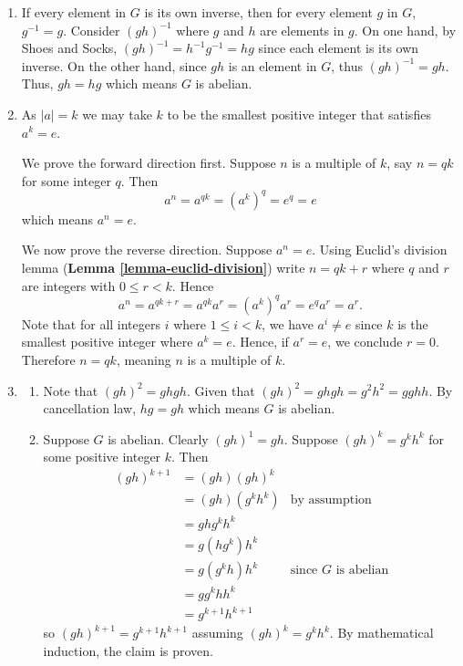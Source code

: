 \begin{enumerate}
    \item If every element in $G$ is its own inverse, then for every element $g$ in $G$, $g^{-1} = g$. Consider $(gh)^{-1}$ where $g$ and $h$ are elements in $g$. On one hand, by Shoes and Socks, $(gh)^{-1} = h^{-1}g^{-1} = hg$ since each element is its own inverse. On the other hand, since $gh$ is an element in $G$, thus $(gh)^{-1} = gh$. Thus, $gh = hg$ which means $G$ is abelian.
    
    \item As $|a| = k$ we may take $k$ to be the smallest positive integer that satisfies $a^k = e$.
    
    We prove the forward direction first. Suppose $n$ is a multiple of $k$, say $n = qk$ for some integer $q$. Then
    \[
        a^n = a^{qk} = \left(a^k\right)^q = e^q = e    
    \]
    which means $a^n = e$.
    
    We now prove the reverse direction. Suppose $a^n = e$. Using Euclid's division lemma (\textbf{Lemma \ref{lemma-euclid-division}}) write $n = qk + r$ where $q$ and $r$ are integers with $0 \leq r < k$. Hence
    \[
        a^n = a^{qk + r} = a^{qk}a^r = \left(a^k\right)^qa^r = e^qa^r = a^r.
    \]
    Note that for all integers $i$ where $1 \leq i < k$, we have $a^i \neq e$ since $k$ is the smallest positive integer where $a^k = e$. Hence, if $a^r = e$, we conclude $r = 0$. Therefore $n = qk$, meaning $n$ is a multiple of $k$.

    \item \begin{enumerate}[label=(\alph*)]
        \item Note that $(gh)^2 = ghgh$. Given that $(gh)^2 = ghgh = g^2h^2 = gghh$. By cancellation law, $hg = gh$ which means $G$ is abelian.
        \item Suppose $G$ is abelian. Clearly $(gh)^1 = gh$. Suppose $(gh)^{k} = g^kh^k$ for some positive integer $k$. Then
        \begin{align*}
            (gh)^{k+1} &= (gh)(gh)^k\\
            &= (gh)(g^kh^k) & \text{by assumption}\\
            &= ghg^kh^k\\
            &= g(hg^k)h^k\\
            &= g(g^kh)h^k & \text{since } G \text{ is abelian}\\
            &= gg^khh^k\\
            &= g^{k+1}h^{k+1}
        \end{align*}
        so $(gh)^{k+1} = g^{k+1}h^{k+1}$ assuming $(gh)^k = g^kh^k$. By mathematical induction, the claim is proven.
    \end{enumerate}


\end{enumerate}
